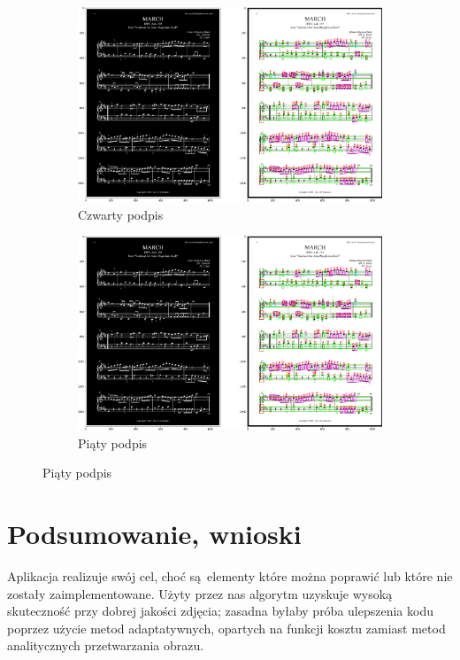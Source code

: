 \documentclass[12pt]{article}
\begin{document}
\begin{figure}[h!]
	\begin{subfigure}[b]{0.48\linewidth}
		\includegraphics[width=\linewidth]{Zdj0.png}
		\caption{Czwarty podpis}
	\end{subfigure}
	\begin{subfigure}[b]{0.48\linewidth}
		\includegraphics[width=\linewidth]{Zdj0.png}
		\caption{Piąty podpis}
	\end{subfigure}
\end{figure}

\section{Podsumowanie, wnioski}
Aplikacja realizuje swój cel, choć są elementy które można poprawić lub które nie zostały zaimplementowane. Użyty przez nas algorytm uzyskuje wysoką skuteczność przy dobrej jakości zdjęcia; zasadna byłaby próba ulepszenia kodu poprzez użycie metod adaptatywnych, opartych na funkcji kosztu zamiast metod analitycznych przetwarzania obrazu.
\end{document}
